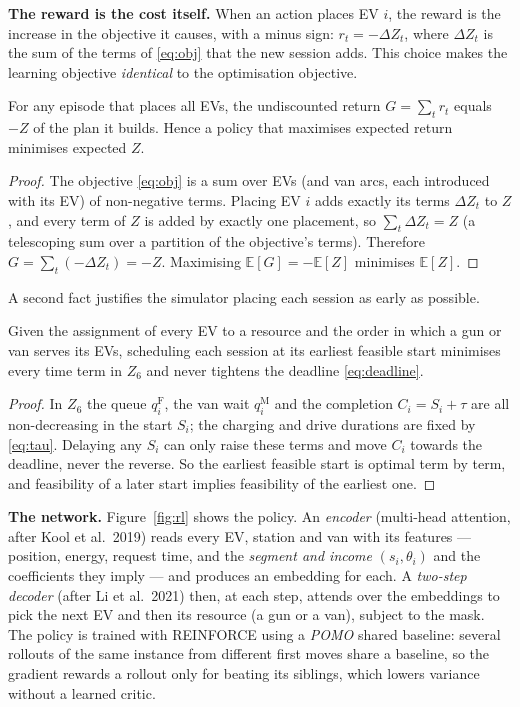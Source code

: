 \textbf{The reward is the cost itself.} When an action places EV $i$, the reward is the increase in the objective
it causes, with a minus sign: $r_t=-\Delta Z_t$, where $\Delta Z_t$ is the sum of the terms of \eqref{eq:obj} that
the new session adds. This choice makes the learning objective \emph{identical} to the optimisation objective.

\begin{proposition}
\label{prop:return}
For any episode that places all EVs, the undiscounted return $G=\sum_t r_t$ equals $-Z$ of the plan it builds.
Hence a policy that maximises expected return minimises expected $Z$.
\end{proposition}
\begin{proof}
The objective \eqref{eq:obj} is a sum over EVs (and van arcs, each introduced with its EV) of non-negative terms.
Placing EV $i$ adds exactly its terms $\Delta Z_t$ to $Z$, and every term of $Z$ is added by exactly one placement,
so $\sum_t \Delta Z_t=Z$ (a telescoping sum over a partition of the objective's terms). Therefore
$G=\sum_t(-\Delta Z_t)=-Z$. Maximising $\mathbb E[G]=-\mathbb E[Z]$ minimises $\mathbb E[Z]$.
\end{proof}

A second fact justifies the simulator placing each session as early as possible.
\begin{proposition}
\label{prop:earliest}
Given the assignment of every EV to a resource and the order in which a gun or van serves its EVs, scheduling each
session at its earliest feasible start minimises every time term in $Z_6$ and never tightens the deadline
\eqref{eq:deadline}.
\end{proposition}
\begin{proof}
In $Z_6$ the queue $q^{\mathrm F}_i$, the van wait $q^{\mathrm M}_i$ and the completion $C_i=S_i+\tau$ are all
non-decreasing in the start $S_i$; the charging and drive durations are fixed by \eqref{eq:tau}. Delaying any $S_i$
can only raise these terms and move $C_i$ towards the deadline, never the reverse. So the earliest feasible start
is optimal term by term, and feasibility of a later start implies feasibility of the earliest one.
\end{proof}

\textbf{The network.} Figure~\ref{fig:rl} shows the policy. An \emph{encoder} (multi-head attention, after
Kool et al.\ 2019) reads every EV, station and van with its features --- position, energy, request time, and the
\emph{segment and income} $(s_i,\theta_i)$ and the coefficients they imply --- and produces an embedding for each.
A \emph{two-step decoder} (after Li et al.\ 2021) then, at each step, attends over the embeddings to pick the next
EV and then its resource (a gun or a van), subject to the mask. The policy is trained with REINFORCE using a
\emph{POMO} shared baseline: several rollouts of the same instance from different first moves share a baseline, so
the gradient rewards a rollout only for beating its siblings, which lowers variance without a learned critic.

